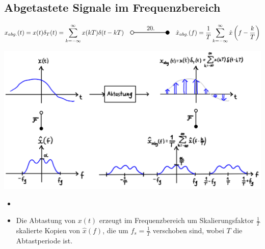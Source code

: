 \documentclass[11pt]{article}
\newcommand{\transform}[2]{%
    \begin{tikzpicture}
        \draw[thick] (0,0) circle (0.1);
        \draw[thick] (0.1,0) -- (#2,0) node[midway, above] {#1};
        \filldraw[thick] (#2,0) circle (0.1);
    \end{tikzpicture}%
}
\begin{document}
\subsection*{Abgetastete Signale im Frequenzbereich}
\vspace*{-0.5cm}
$$x_{abg.}(t) = x(t)\delta_T(t) = \sum_{k=-\infty}^{\infty} x(kT)\delta(t-kT) \hspace{10pt} \transform{20.}{2} \hspace{10pt} \hat{x}_{abg.}(f) = \frac{1}{T} \sum_{k = -\infty}^\infty \hat{x}\left( f- \frac{k}{T} \right)$$
\vspace*{-0.5cm}
\begin{center}
    \includegraphics[width=0.8\linewidth]{docimgs/abtastung2.jpg}
\end{center}
\vspace*{-0.75cm}
\begin{itemize}[leftmargin=0pt]
    \item[] %
    \item[]  Die Abtastung von $x(t)$ erzeugt im Frequenzbereich um Skalierungsfaktor $\frac{1}{T}$ skalierte Kopien von $\hat{x}(f)$, die um $f_s = \frac{1}{T}$ verschoben sind, wobei $T$ die Abtastperiode ist.
\end{itemize}
\end{document}
